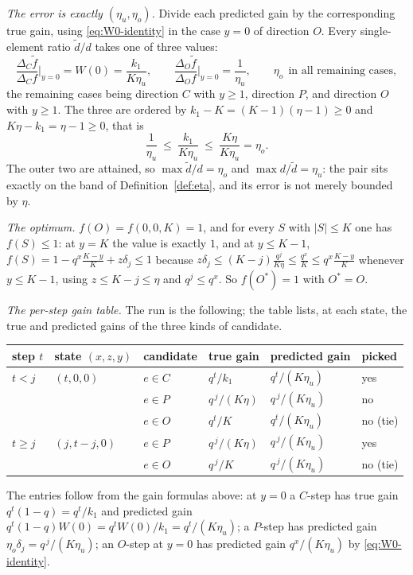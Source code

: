 \emph{The error is exactly $(\eta_u,\eta_o)$.}  Divide each predicted gain by
the corresponding true gain, using \eqref{eq:W0-identity} in the case $y=0$ of
direction $O$.  Every single-element ratio $\tilde d/d$ takes one of three
values:
\[
  \frac{\Delta_C\tilde f}{\Delta_Cf}\Big|_{y=0}=W(0)=\frac{k_1}{K\eta_u},
  \qquad
  \frac{\Delta_O\tilde f}{\Delta_Of}\Big|_{y=0}=\frac1{\eta_u},
  \qquad
  \eta_o\ \ \text{in all remaining cases},
\]
the remaining cases being direction $C$ with $y\ge1$, direction $P$, and
direction $O$ with $y\ge1$.  The three are ordered by $k_1-K=(K-1)(\eta-1)\ge0$ and
$K\eta-k_1=\eta-1\ge0$, that is
\[
  \frac1{\eta_u}\ \le\ \frac{k_1}{K\eta_u}\ \le\ \frac{K\eta}{K\eta_u}=\eta_o .
\]
The outer two are attained, so $\max\tilde d/d=\eta_o$ and
$\max d/\tilde d=\eta_u$: the pair sits exactly on the band of
Definition~\ref{def:eta}, and its error is not merely bounded by $\eta$.

\emph{The optimum.}  $f(O)=f(0,0,K)=1$, and for every $S$ with $|S|\le K$ one
has $f(S)\le1$: at $y=K$ the value is exactly $1$, and at $y\le K-1$,
$f(S)=1-q^{x}\frac{K-y}{K}+z\delta_j\le1$ because
$z\delta_j\le(K-j)\frac{q^{j}}{K\eta}\le\frac{q^{x}}{K}\le q^{x}\frac{K-y}{K}$
whenever $y\le K-1$, using $z\le K-j\le\eta$ and $q^{j}\le q^{x}$.  So
$f(O^{\ast})=1$ with $O^{\ast}=O$.

\emph{The per-step gain table.}  The run is the following; the table lists, at
each state, the true and predicted gains of the three kinds of candidate.
\begin{center}
\begin{tabular}{llllll}
\toprule
step $t$ & state $(x,z,y)$ & candidate & true gain & predicted gain & picked \\
\midrule
$t<j$ & $(t,0,0)$ & $e\in C$ & $q^{t}/k_1$ & $q^{t}/(K\eta_u)$ & yes \\
      &           & $e\in P$ & $q^{\,j}/(K\eta)$ & $q^{\,j}/(K\eta_u)$ & no \\
      &           & $e\in O$ & $q^{t}/K$ & $q^{t}/(K\eta_u)$ & no (tie) \\
\midrule
$t\ge j$ & $(j,t-j,0)$ & $e\in P$ & $q^{\,j}/(K\eta)$ &
  $q^{\,j}/(K\eta_u)$ & yes \\
      &            & $e\in O$ & $q^{\,j}/K$ & $q^{\,j}/(K\eta_u)$ & no (tie)\\
\bottomrule
\end{tabular}
\end{center}
The entries follow from the gain formulas above: at $y=0$ a $C$-step has true
gain $q^{t}(1-q)=q^{t}/k_1$ and predicted gain
$q^{t}(1-q)W(0)=q^{t}W(0)/k_1=q^{t}/(K\eta_u)$; a $P$-step has predicted gain
$\eta_o\delta_j=q^{\,j}/(K\eta_u)$; an $O$-step at $y=0$ has predicted gain
$q^{x}/(K\eta_u)$ by \eqref{eq:W0-identity}.

